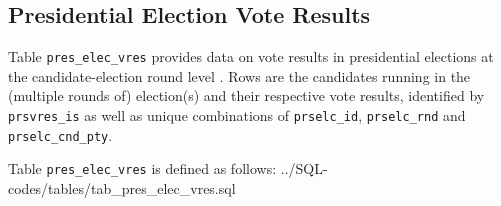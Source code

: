 \subsection{Presidential Election Vote Results}\label{subsec_tab_pres_elec_vres}

Table \texttt{pres\_elec\_vres} provides data on vote results in presidential elections at the candidate-election round level . 
Rows are the candidates running in the (multiple rounds of) election(s) and their respective vote results, identified by \texttt{prsvres\_is} as well as unique combinations of \texttt{prselc\_id}, \texttt{prselc\_rnd} and \texttt{prselc\_cnd\_pty}.

Table \texttt{pres\_elec\_vres} is defined as follows:
%
{../SQL-codes/tables/tab_pres_elec_vres.sql}

